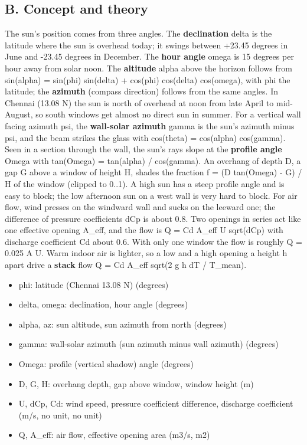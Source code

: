 \documentclass[11pt,a4paper]{article}
\begin{document}
\subsection*{B. Concept and theory}
The sun's position comes from three angles. The \textbf{declination} delta is the latitude where the sun is overhead today; it swings between +23.45 degrees in June and -23.45 degrees in December. The \textbf{hour angle} omega is 15 degrees per hour away from solar noon. The \textbf{altitude} alpha above the horizon follows from sin(alpha) = sin(phi) sin(delta) + cos(phi) cos(delta) cos(omega), with phi the latitude; the \textbf{azimuth} (compass direction) follows from the same angles. In Chennai (13.08 N) the sun is north of overhead at noon from late April to mid-August, so south windows get almost no direct sun in summer. For a vertical wall facing azimuth psi, the \textbf{wall-solar azimuth} gamma is the sun's azimuth minus psi, and the beam strikes the glass with cos(theta) = cos(alpha) cos(gamma). Seen in a section through the wall, the sun's rays slope at the \textbf{profile angle} Omega with tan(Omega) = tan(alpha) / cos(gamma). An overhang of depth D, a gap G above a window of height H, shades the fraction f = (D tan(Omega) - G) / H of the window (clipped to 0..1). A high sun has a steep profile angle and is easy to block; the low afternoon sun on a west wall is very hard to block. For air flow, wind presses on the windward wall and sucks on the leeward one; the difference of pressure coefficients dCp is about 0.8. Two openings in series act like one effective opening A\_eff, and the flow is Q = Cd A\_eff U sqrt(dCp) with discharge coefficient Cd about 0.6. With only one window the flow is roughly Q = 0.025 A U. Warm indoor air is lighter, so a low and a high opening a height h apart drive a \textbf{stack} flow Q = Cd A\_eff sqrt(2 g h dT / T\_mean).

\begin{itemize}[nosep]
\item phi: latitude (Chennai 13.08 N) (degrees)
\item delta, omega: declination, hour angle (degrees)
\item alpha, az: sun altitude, sun azimuth from north (degrees)
\item gamma: wall-solar azimuth (sun azimuth minus wall azimuth) (degrees)
\item Omega: profile (vertical shadow) angle (degrees)
\item D, G, H: overhang depth, gap above window, window height (m)
\item U, dCp, Cd: wind speed, pressure coefficient difference, discharge coefficient (m/s, no unit, no unit)
\item Q, A\_eff: air flow, effective opening area (m3/s, m2)
\end{itemize}
\end{document}
